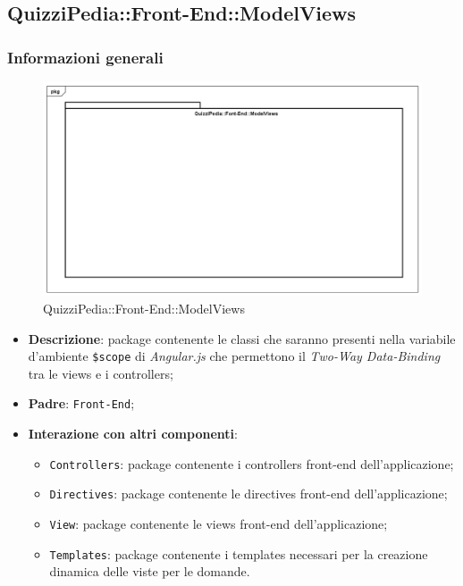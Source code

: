 \newpage

\subsection{QuizziPedia::Front-End::ModelViews}
\subsubsection{Informazioni generali}
\label{QuizziPedia::Front-End::ModelViews}
\begin{figure}
	\centering
	\includegraphics[scale=0.45]{UML/Package/QuizziPedia_Front-End_ModelViews.png}
	\caption{QuizziPedia::Front-End::ModelViews}
\end{figure}
\begin{itemize}
	\item \textbf{Descrizione}: package contenente le classi che saranno presenti nella variabile d'ambiente \texttt{\$scope} di \textit{Angular.js} che permettono il \textit{Two-Way Data-Binding} tra le views e i controllers;
	\item \textbf{Padre}: \texttt{Front-End};
	\item \textbf{Interazione con altri componenti}:
	\begin{itemize}
		\item \texttt{Controllers}: package contenente i controllers front-end dell'applicazione;
		\item \texttt{Directives}: package contenente le directives front-end dell'applicazione;
		\item \texttt{View}: package contenente le views front-end dell'applicazione;
		\item \texttt{Templates}: package contenente i templates necessari per la creazione dinamica delle viste per le domande.
	\end{itemize}
\end{itemize}
